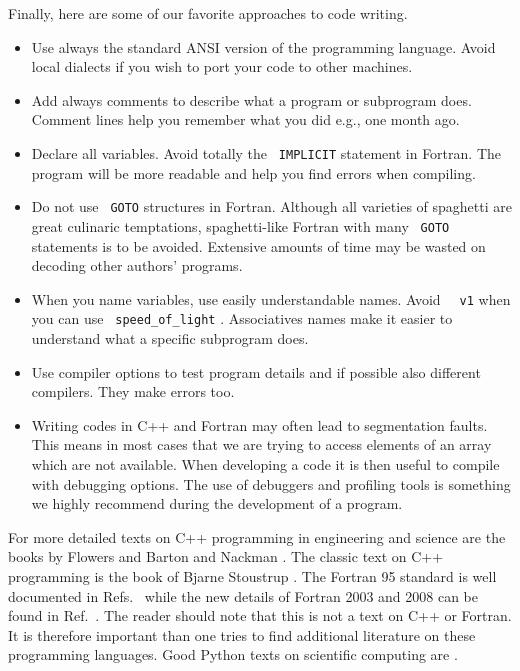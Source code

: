 Finally, here are some of our favorite  approaches to code writing.
\begin{itemize}
%
\item Use always the standard ANSI version of the programming language.
Avoid local dialects if you wish to port your code to other machines.
%
\item Add always comments to describe  what a program or subprogram does.
Comment lines help you remember what you did e.g., one month ago.
%
\item Declare all variables. Avoid totally the \verb? IMPLICIT?  statement
in Fortran. The program will be more readable and help
you find errors when compiling. 
%
\item Do not use \verb? GOTO?  structures in Fortran. Although all varieties of spaghetti
are great culinaric temptations, spaghetti-like Fortran with many \verb? GOTO?  
statements is to be avoided.
Extensive amounts of time may be wasted on decoding other authors' programs. 

%
\item When you name variables, use easily understandable
names. Avoid \verb?  v1?  when you can use
\verb? speed_of_light? . Associatives names make it
easier to understand what a specific subprogram does.
%
\item Use compiler options to test program details and if possible
also different compilers. They make errors too. 
\item Writing codes in C++ and Fortran may often lead to segmentation faults. This means in most cases that we are trying
to access elements of an array which are not available. When developing a code it is then useful to compile with debugging options.
The use of debuggers and profiling tools is something
we highly recommend during the development of a program. 

\end{itemize} 











For more detailed texts on C++ programming in engineering and
science are the books by Flowers \cite{flowers} and Barton and Nackman \cite{barton}.
The classic text on C++ programming is the book of Bjarne Stoustrup \cite{stoustrup1997}.
The Fortran 95 standard is well documented in Refs.~\cite{f95ref,metcalf1996,marshall1995}
while the
new details of Fortran 2003 and 2008 can be found in Ref.~\cite{f2003,metcalf2011}.
The reader should note that this is not a text on C++ or Fortran.
It is therefore important than one tries to find additional literature on these programming languages.
Good Python texts on scientific computing
are \cite{langtangen2006,langtangen2009}.

